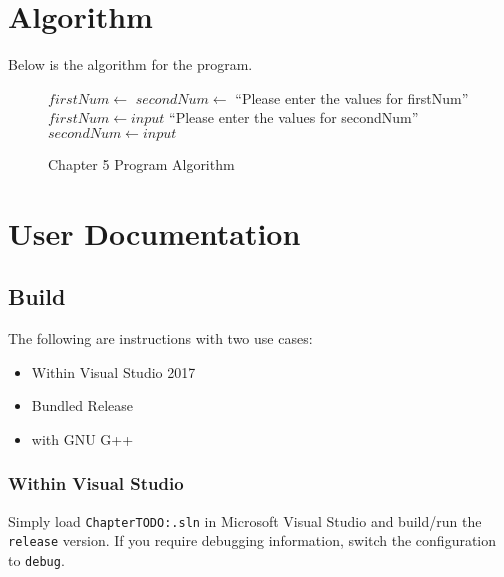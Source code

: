 \documentclass[a4paper,11pt]{article}
\begin{document}
  \newpage
  \section{Algorithm}
    Below is the algorithm for the program.
    \begin{figure}[h]
      \caption{Chapter 5 Program Algorithm}
      \vspace{12pt}
      \begin{algorithmic}
        \State {}
        \State 
        \State $firstNum\gets $
        \State $secondNum\gets $
        \State {}
        \State {} ``Please enter the values for firstNum''
          \State $firstNum\gets input$
        \State {} ``Please enter the values for secondNum''
          \State $secondNum\gets input$
      \end{algorithmic}
      \label{alg:c5}
    \end{figure}


  \newpage
  \section{User Documentation}

    \subsection{Build}
      The following are instructions with two use cases:
      \begin{itemize}
        \item Within Visual Studio 2017
        \item Bundled Release
        \item with GNU G++
      \end{itemize}
      \subsubsection{Within Visual Studio}
        Simply load \texttt{ChapterTODO:.sln} in Microsoft Visual Studio and 
          build/run the \texttt{release} version. If you require debugging
          information, switch the configuration to \texttt{debug}.
\end{document}
